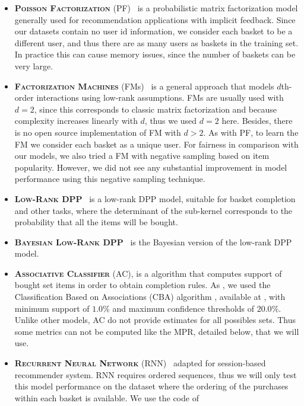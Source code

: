 \begin{itemize}
\begin{itemize}
\item \textbf{\textsc{Poisson Factorization}}
(PF)~\cite{DBLP:journals/corr/GopalanHB13} is a probabilistic matrix
factorization model generally used for recommendation applications with implicit
feedback. Since our datasets contain no user id information, we consider each
basket to be a different user, and thus there are as many users as baskets in
the training set. In practice this can cause memory issues, since the number of
baskets can be very large. 
\item \textbf{\textsc{Factorization Machines}}
(FMs)~\cite{Rendle:2010:FM:1933307.1934620} is a general approach that models
$d$th-order interactions using low-rank assumptions. FMs are usually used with
$d=2$, since this corresponds to classic matrix factorization and because complexity 
increases linearly with $d$, thus we used $d=2$ here. 
Besides, there is no open source implementation of FM with $d>2$.
As with PF, to learn the FM we consider each basket as a
unique user. For fairness in comparison with our models, we also tried a FM with
negative sampling based on item popularity.  However, we did not see any
substantial improvement in model performance using this negative sampling
technique. 
\item \textbf{\textsc{Low-Rank DPP}}~\cite{DBLP:conf/aaai/GartrellPK17} is a
low-rank DPP model, suitable for basket completion and other tasks, where the
determinant of the sub-kernel corresponds to the probability that all the items
will be bought.
\item \textbf{\textsc{Bayesian Low-Rank
DPP}}~\cite{DBLP:conf/recsys/GartrellPK16} is the Bayesian version of the
low-rank DPP model.
\item \textbf{\textsc{Associative Classifier}} (AC), is a algorithm that computes support of bought 
set items in order to obtain completion rules. As \cite{DBLP:conf/aaai/GartrellPK17}, 
we used the Classification Based on Associations (CBA) algorithm \cite{Liu:1998:ICA:3000292.3000305}, 
available at \cite{arules}, with minimum support of $1.0\%$ and maximum confidence thresholds of $20.0\%$. 
Unlike other models, AC do not provide estimates for all possibles sets. 
Thus some metrics can not be computed like the MPR, detailed below, that we will use. 
\item \textbf{\textsc{Recurrent Neural Network}} (RNN)~\cite{DBLP:journals/corr/HidasiKBT15} 
adapted for session-based recommender system. RNN requires ordered sequences, thus we will only 
test this model performance on the dataset where the ordering of the purchases within each basket 
is available. We use the code of \cite{RNNcode}
\end{itemize}
\end{itemize}
